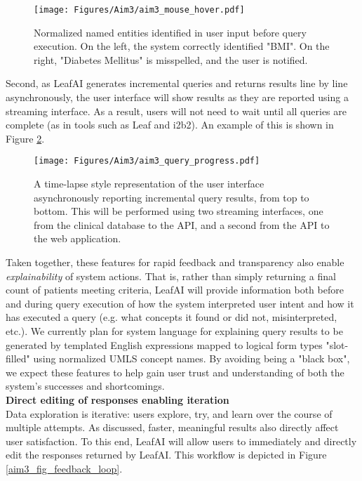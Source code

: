 \documentclass[../main.tex]{subfiles}
\begin{document}
\begin{figure}[h!]
  \centering
  \texttt{[image: Figures/Aim3/aim3\_mouse\_hover.pdf]}  
  \caption{Normalized named entities identified in user input before query execution. On the left, the system correctly identified "BMI". On the right, "Diabetes Mellitus" is misspelled, and the user is notified.}
\label{aim3_fig_mouse_hover}
\end{figure}

Second, as LeafAI generates incremental queries and returns results line by line asynchronously, the user interface will show results as they are reported using a streaming interface. As a result, users will not need to wait until all queries are complete (as in tools such as Leaf and i2b2). An example of this is shown in Figure \ref{aim3_fig_query_progress}.

\begin{figure}[h!]
  \centering
  \texttt{[image: Figures/Aim3/aim3\_query\_progress.pdf]}  
  \caption{A time-lapse style representation of the user interface asynchronously reporting incremental query results, from top to bottom. This will be performed using two streaming interfaces, one from the clinical database to the API, and a second from the API to the web application.}
\label{aim3_fig_query_progress}
\end{figure}

Taken together, these features for rapid feedback and transparency also enable \textit{explainability} of system actions. That is, rather than simply returning a final count of patients meeting criteria, LeafAI will provide information both before and during query execution of how the system interpreted user intent and how it has executed a query (e.g. what concepts it found or did not, misinterpreted, etc.). We currently plan for system language for explaining query results to be generated by templated English expressions mapped to logical form types "slot-filled" using normalized UMLS concept names. By avoiding being a "black box", we expect these features to help gain user trust and understanding of both the system's successes and shortcomings. \\

\noindent \textbf{Direct editing of responses enabling iteration} \\
Data exploration is iterative: users explore, try, and learn over the course of multiple attempts. As discussed, faster, meaningful results also directly affect user satisfaction. To this end, LeafAI will allow users to immediately and directly edit the responses returned by LeafAI. This workflow is depicted in Figure \ref{aim3_fig_feedback_loop}. 
\end{document}
